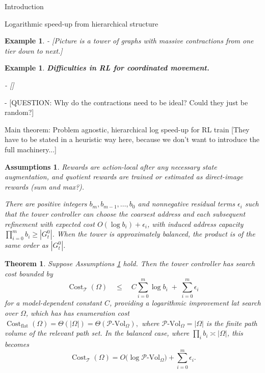 \documentclass[11pt]{article}
\newtheorem{assumptions}[subsubsection]{Assumptions}
\newtheorem{example}[subsubsection]{Example}
\newtheorem{theorem}[subsubsection]{Theorem}
\newcommand{\PVol}{\mathcal{P}\text{-}\mathrm{Vol}}
\newcommand{\cost}{\operatorname{Cost}}
\begin{document}
\begin{section}{Introduction}
\begin{subsection}{Logarithmic speed-up from hierarchical structure}
\begin{example}
- [Picture is a tower of graphs with massive contractions from one tier down to next.]

\end{example}

\begin{example}
{\bf Difficulties in RL for coordinated movement.}
\normalfont

- []

\end{example}

- [QUESTION: Why do the contractions need to be ideal? Could they just be random?]

\end{subsection}

\begin{subsection}{Main theorem: Problem agnostic, hierarchical log speed-up for RL train}
[They have to be stated in a heuristic way here, because we don't want to introduce the full machinery...]



\begin{assumptions}\label{ass: simple ass}
Rewards are action-local after any necessary state augmentation, and quotient rewards are trained or estimated as direct-image rewards (sum and max?).
 

There are positive integers \(b_m,b_{m-1},\ldots,b_0\) and nonnegative residual terms \(\epsilon_i\) such that the tower controller can choose the coarsest address and each subsequent refinement with expected cost
$O(\log b_i)+\epsilon_i$, with induced address capacity $\prod_{i=0}^{m} b_i \ge |G^{0}_{t}|$.
When the tower is approximately balanced, the product is of the same order as \(|G^{0}_{t}|\).
\end{assumptions}


\begin{theorem}\label{theorem: main}
Suppose Assumptions \ref{ass: simple ass} hold.  Then the tower controller has search cost bounded by
$$
    \cost_{\mathcal{T}}(\Omega)
    \quad\le\quad
    C\sum_{i=0}^{m}\log b_i \;+\; \sum_{i=0}^{m}\epsilon_i
$$
for a model-dependent constant \(C\), providing a logarithmic improvement lat search over \(\Omega\), which has has enumeration cost $
    \cost_{\mathrm{flat}}(\Omega)=\Theta(|\Omega|)=\Theta(\PVol_{\Omega}),
$
where \(\PVol_{\Omega}=|\Omega|\) is the finite path volume of the relevant path set.  In the balanced case, where \(\prod_i b_i\asymp |\Omega|\), this becomes
$$
    \cost_{\mathcal{T}}(\Omega)
    =O\bigl(\log \PVol_{\Omega}\bigr)+\sum_{i=0}^{m}\epsilon_i.
$$
\end{theorem}


\end{subsection}
\end{section}
\end{document}
